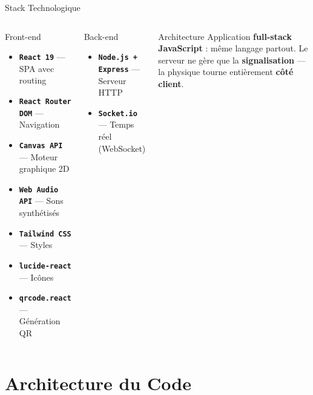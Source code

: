 \documentclass[aspectratio=169,12pt]{beamer}
\newcommand{\tech}[1]{\textcolor{mycyan}{\textbf{\texttt{#1}}}}
\begin{document}
\begin{frame}{Stack Technologique}
  \begin{columns}
    \begin{block}{Front-end}
      \begin{itemize}
        \item \tech{React 19} --- SPA avec routing
        \item \tech{React Router DOM} --- Navigation
        \item \tech{Canvas API} --- Moteur graphique 2D
        \item \tech{Web Audio API} --- Sons synth\'etis\'es
        \item \tech{Tailwind CSS} --- Styles
        \item \tech{lucide-react} --- Ic\^ones
        \item \tech{qrcode.react} --- G\'en\'eration QR
      \end{itemize}
    \end{block}
    \begin{block}{Back-end}
      \begin{itemize}
        \item \tech{Node.js + Express} --- Serveur HTTP
        \item \tech{Socket.io} --- Temps r\'eel (WebSocket)
      \end{itemize}
    \end{block}
    \vspace{0.3cm}
    \begin{alertblock}{Architecture}
      Application \textbf{full-stack JavaScript} : m\^eme langage partout.
      Le serveur ne g\`ere que la \textbf{signalisation} --- la physique tourne
      enti\`erement \textbf{c\^ot\'e client}.
    \end{alertblock}
  \end{columns}
\end{frame}

\section{Architecture du Code}
\end{document}

